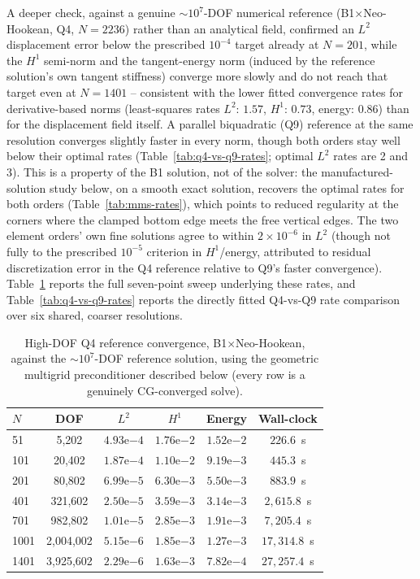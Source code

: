 \documentclass[final,5p,times]{elsarticle}
\begin{document}
A deeper check, against a genuine
$\sim$$10^7$-DOF numerical reference (B1$\times$Neo-Hookean, Q4, $N{=}2236$)
rather than an analytical field, confirmed an $L^2$ displacement error below
the prescribed $10^{-4}$ target already at $N{=}201$, while the $H^1$
semi-norm and the tangent-energy norm (induced by the reference solution's
own tangent stiffness) converge more slowly and do not reach that target
even at $N{=}1401$ -- consistent with the lower fitted convergence rates for
derivative-based norms (least-squares rates $L^2$: $1.57$, $H^1$: $0.73$,
energy: $0.86$) than for the displacement field itself. A parallel
biquadratic (Q9) reference at the same resolution converges slightly
faster in every norm, though both orders stay well below their optimal
rates (Table~\ref{tab:q4-vs-q9-rates}; optimal $L^2$ rates are 2 and 3).
This is a property of the B1 solution, not of the solver: the
manufactured-solution study below, on a smooth exact solution, recovers
the optimal rates for both orders (Table~\ref{tab:mms-rates}), which
points to reduced regularity at the corners where the clamped bottom
edge meets the free vertical edges. The two element orders'
own fine solutions agree to within $2\times10^{-6}$ in $L^2$ (though not
fully to the prescribed $10^{-5}$ criterion in $H^1$/energy, attributed to
residual discretization error in the Q4 reference relative to Q9's faster
convergence). Table~\ref{tab:high-dof-q4} reports the full seven-point
sweep underlying these rates, and Table~\ref{tab:q4-vs-q9-rates} reports
the directly fitted Q4-vs-Q9 rate comparison over six shared, coarser
resolutions.

\begin{table}[h]
\centering
\caption{High-DOF Q4 reference convergence, B1$\times$Neo-Hookean, against
  the $\sim10^7$-DOF reference solution, using the geometric multigrid
  preconditioner described below (every row is a genuinely
  CG-converged solve).}
\label{tab:high-dof-q4}
\small
\begin{tabular}{lccccc}
\toprule
$N$ & DOF & $L^2$ & $H^1$ & Energy & Wall-clock \\
\midrule
51   & 5{,}202     & $4.93\mathrm{e}{-4}$ & $1.76\mathrm{e}{-2}$ & $1.52\mathrm{e}{-2}$ & $226.6$~s \\
101  & 20{,}402    & $1.87\mathrm{e}{-4}$ & $1.10\mathrm{e}{-2}$ & $9.19\mathrm{e}{-3}$ & $445.3$~s \\
201  & 80{,}802    & $6.99\mathrm{e}{-5}$ & $6.30\mathrm{e}{-3}$ & $5.50\mathrm{e}{-3}$ & $883.9$~s \\
401  & 321{,}602   & $2.50\mathrm{e}{-5}$ & $3.59\mathrm{e}{-3}$ & $3.14\mathrm{e}{-3}$ & $2{,}615.8$~s \\
701  & 982{,}802   & $1.01\mathrm{e}{-5}$ & $2.85\mathrm{e}{-3}$ & $1.91\mathrm{e}{-3}$ & $7{,}205.4$~s \\
1001 & 2{,}004{,}002 & $5.15\mathrm{e}{-6}$ & $1.85\mathrm{e}{-3}$ & $1.27\mathrm{e}{-3}$ & $17{,}314.8$~s \\
1401 & 3{,}925{,}602 & $2.29\mathrm{e}{-6}$ & $1.63\mathrm{e}{-3}$ & $7.82\mathrm{e}{-4}$ & $27{,}257.4$~s \\
\bottomrule
\end{tabular}
\end{table}
\end{document}
